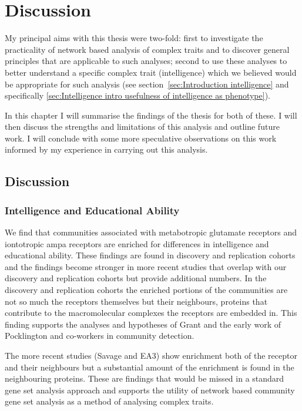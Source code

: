 \chapter{Discussion}

My principal aims with this thesis were two-fold: first to investigate the practicality of network based analysis of complex traits and to discover general  principles that are applicable to such analyses; second to use these analyses to better understand a specific complex trait (intelligence) which we believed would be appropriate for such analysis (see section~\ref{sec:Introduction intelligence} and specifically  \ref{sec:Intelligence intro usefulness of intelligence as phenotype}).

In this chapter I will summarise the findings of the thesis for both of these. I will then discuss the strengths and limitations of this analysis and outline future work. I will conclude with some more speculative observations on this work informed by my experience in carrying out this analysis.
\section{Discussion}
\subsection{Intelligence and Educational Ability}
We find that communities associated with metabotropic glutamate receptors and iontotropic ampa receptors are enriched for differences in intelligence and educational ability. These findings are found in discovery and replication cohorts and the findings become stronger in more recent studies that overlap with our discovery and replication cohorts but provide additional numbers. 
In the discovery and replication cohorts the enriched portions of the communities are not so much the receptors themselves but their neighbours, proteins that contribute to the macromolecular complexes the receptors are embedded in. This finding supports the analyses and hypotheses of Grant \cite{grant2012synaptopathies} and the early work of Pocklington and co-workers \cite{pocklington2006proteomes} in community detection. 

The more recent studies (Savage and EA3) show enrichment both of the receptor and their neighbours but a substantial amount of the enrichment is found in the neighbouring proteins. These are findings that would be missed in a standard gene set analysis approach and supports the utility of network based community gene set analysis as a method of analysing complex traits. 

